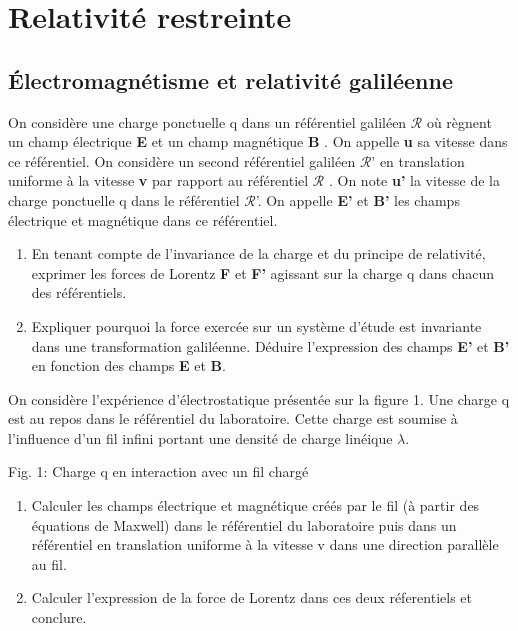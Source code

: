 
\section{Relativité restreinte}
\subsection{Électromagnétisme et relativité galiléenne}

On considère une charge ponctuelle q dans un référentiel galiléen $\mathcal{R}$ où règnent un champ
électrique {\bf E} et un champ magnétique {\bf B} . On appelle {\bf u} sa vitesse dans ce référentiel.
On considère un second référentiel galiléen $\mathcal{R}$' en translation uniforme à la vitesse {\bf v} par rapport
au référentiel $\mathcal{R}$ . On note {\bf u'} la vitesse de la charge ponctuelle q dans le référentiel $\mathcal{R}$'. On appelle
{\bf E'} et {\bf B'} les champs électrique et magnétique dans ce référentiel.
\begin{enumerate}
  \item En tenant compte de l'invariance de la charge et du principe de relativité, exprimer les
forces de Lorentz {\bf F} et {\bf F'} agissant sur la charge q dans chacun des référentiels.
  \item Expliquer pourquoi la force exercée sur un système d'étude est invariante dans une transformation galiléenne. Déduire l'expression des champs {\bf E'} et {\bf B'} en fonction des champs {\bf E}
et {\bf B}.
\setcounter{numero}{\theenumi}\end{enumerate}
On considère l'expérience d'électrostatique présentée sur la figure 1. Une charge q est au repos
dans le référentiel du laboratoire. Cette charge est soumise à l'influence d'un fil infini portant
une densité de charge linéique $\lambda$.

\begin{center}
\vspace{0.3cm}

\vspace{0.3cm}
Fig. 1: Charge q en interaction avec un fil chargé
\end{center}
\begin{enumerate}
\setcounter{enumi}{\thenumero} 
  \item Calculer les champs électrique et magnétique créés par le fil (à partir des équations de
Maxwell) dans le référentiel du laboratoire puis dans un référentiel en translation uniforme
à la vitesse v dans une direction parallèle au fil.
  \item Calculer l'expression de la force de Lorentz dans ces deux réferentiels et conclure.
\end{enumerate}

